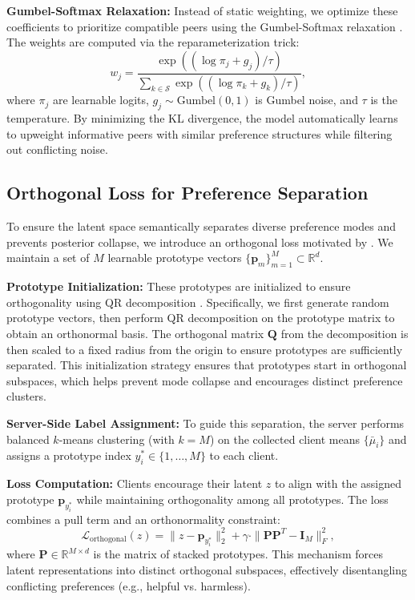 \textbf{Gumbel-Softmax Relaxation:} Instead of static weighting, we optimize these coefficients to prioritize compatible peers using the Gumbel-Softmax relaxation \citep{jang2016categorical}. The weights are computed via the reparameterization trick:
\begin{equation} \label{eq:gumbel_weights}
    w_j = \frac{\exp((\log \pi_j + g_j) / \tau)}{\sum_{k \in \mathcal{S}} \exp((\log \pi_k + g_k) / \tau)},
\end{equation}
where $\pi_j$ are learnable logits, $g_j \sim \text{Gumbel}(0, 1)$ is Gumbel noise, and $\tau$ is the temperature. By minimizing the KL divergence, the model automatically learns to upweight informative peers with similar preference structures while filtering out conflicting noise.

\subsection{Orthogonal Loss for Preference Separation}
\label{sec:orthogonal}
To ensure the latent space semantically separates diverse preference modes and prevents posterior collapse, we introduce an orthogonal loss motivated by \citep{li2024preventingcollapsecontrastivelearning}. We maintain a set of $M$ learnable prototype vectors $\{\mathbf{p}_m\}_{m=1}^M \subset \mathbb{R}^d$. 

\textbf{Prototype Initialization:} These prototypes are initialized to ensure orthogonality using QR decomposition \citep{saxe2013exact}. Specifically, we first generate random prototype vectors, then perform QR decomposition on the prototype matrix to obtain an orthonormal basis. The orthogonal matrix $\mathbf{Q}$ from the decomposition is then scaled to a fixed radius from the origin to ensure prototypes are sufficiently separated. This initialization strategy ensures that prototypes start in orthogonal subspaces, which helps prevent mode collapse and encourages distinct preference clusters.

\textbf{Server-Side Label Assignment:} To guide this separation, the server performs balanced $k$-means clustering (with $k=M$) on the collected client means $\{\bar{\mu}_i\}$ and assigns a prototype index $y_i^* \in \{1, \dots, M\}$ to each client.

\textbf{Loss Computation:} Clients encourage their latent $z$ to align with the assigned prototype $\mathbf{p}_{y_i^*}$ while maintaining orthogonality among all prototypes. The loss combines a pull term and an orthonormality constraint:
\begin{equation}
    \mathcal{L}_{\text{orthogonal}}(z) = \|z - \mathbf{p}_{y_i^*}\|_2^2 + \gamma \cdot \|\mathbf{P} \mathbf{P}^T - \mathbf{I}_M\|_F^2,
\end{equation}
where $\mathbf{P} \in \mathbb{R}^{M \times d}$ is the matrix of stacked prototypes. This mechanism forces latent representations into distinct orthogonal subspaces, effectively disentangling conflicting preferences (e.g., helpful vs. harmless).

